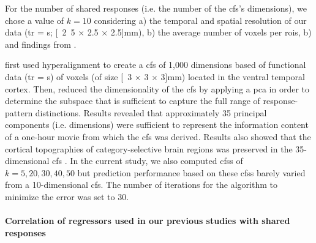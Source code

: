 For the number of shared responses (i.e. the number of the \ac{cfs}'s
dimensions), we chose a value of $k=10$ considering a) the temporal and spatial
resolution of our data (\ac{tr} = \unit[2]{s}; \unit[2.5 $\times$ 2.5 $\times$
2.5]{mm}), b) the average number of voxels per \acp{roi}, b) and findings from
\citet{haxby2011common}.


\citet{haxby2011common} first used hyperalignment to create a \ac{cfs} of 1,000
dimensions based of functional data (\ac{tr} = \unit[3]{s}) of voxels (of size
\unit[3 $\times$ 3 $\times$ 3]{mm}) located in the ventral temporal cortex.
%
Then, \citet{haxby2011common} reduced the dimensionality of the \ac{cfs} by
applying a \ac{pca} in order to determine the subspace that is sufficient to
capture the full range of response-pattern distinctions.
%
Results revealed that approximately 35 principal components (i.e. dimensions)
were sufficient to represent the information content of a one-hour movie from
which the \ac{cfs} was derived.
%
Results also showed that the cortical topographies of category-selective brain
regions was preserved in the 35-dimensional \ac{cfs} \citep{haxby2011common}.
%
In the current study, we also computed \acp{cfs} of $k=5, 20, 30, 40, 50$ but
prediction performance based on these \acp{cfs} barely varied from a
10-dimensional \ac{cfs}.
The number of iterations for the algorithm to minimize the error was set to 30.



\paragraph{Correlation of regressors used in our previous studies with shared
responses}




